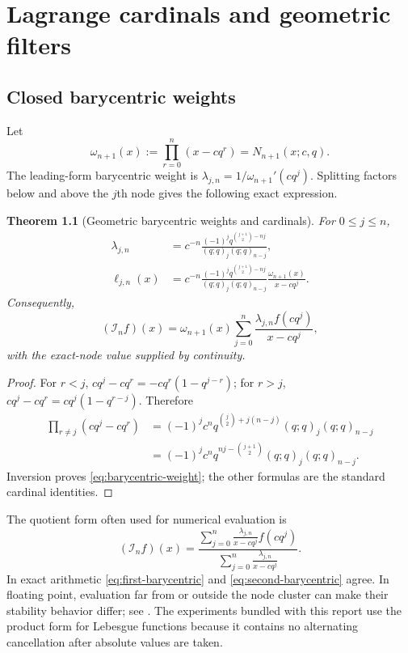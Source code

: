\documentclass[11pt,oneside]{book}
\numberwithin{equation}{chapter}
\newtheorem{theorem}{Theorem}[chapter]
\theoremstyle{definition}
\theoremstyle{remark}
\newcommand{\Interp}{\mathcal I}
\begin{document}
\chapter{Lagrange cardinals and geometric filters}
\label{chap:lagrange}

\section{Closed barycentric weights}

Let
\begin{equation}
 \omega_{n+1}(x):=\prod_{r=0}^n(x-cq^r)=N_{n+1}(x;c,q).
 \label{eq:nodal-polynomial}
\end{equation}
The leading-form barycentric weight is
$\lambda_{j,n}=1/\omega_{n+1}'(cq^j)$.  Splitting factors below and above the
$j$th node gives the following exact expression.

\begin{theorem}[Geometric barycentric weights and cardinals]
\label{thm:geometric-barycentric}
For $0\le j\le n$,
\begin{align}
 \lambda_{j,n}
 &=c^{-n}\frac{(-1)^j
 q^{\binom{j+1}{2}-nj}}
 {(q;q)_j(q;q)_{n-j}},
 \label{eq:barycentric-weight}\\
 \ell_{j,n}(x)
 &=c^{-n}\frac{(-1)^j
 q^{\binom{j+1}{2}-nj}}
 {(q;q)_j(q;q)_{n-j}}
 \frac{\omega_{n+1}(x)}{x-cq^j}.
 \label{eq:lagrange-cardinal-explicit}
\end{align}
Consequently,
\begin{equation}
 (\Interp_nf)(x)
 =\omega_{n+1}(x)
  \sum_{j=0}^n\frac{\lambda_{j,n}f(cq^j)}{x-cq^j},
 \label{eq:first-barycentric}
\end{equation}
with the exact-node value supplied by continuity.
\end{theorem}

\begin{proof}
For $r<j$,
$cq^j-cq^r=-cq^r(1-q^{j-r})$; for $r>j$,
$cq^j-cq^r=cq^j(1-q^{r-j})$.  Therefore
\begin{align*}
 \prod_{r\ne j}(cq^j-cq^r)
 &=(-1)^jc^n
 q^{\binom j2+j(n-j)}(q;q)_j(q;q)_{n-j}\\
 &=(-1)^jc^n
 q^{nj-\binom{j+1}{2}}(q;q)_j(q;q)_{n-j}.
\end{align*}
Inversion proves \eqref{eq:barycentric-weight}; the other formulas are the
standard cardinal identities.
\end{proof}

The quotient form often used for numerical evaluation is
\begin{equation}
 (\Interp_nf)(x)=
 \frac{\displaystyle\sum_{j=0}^n
       \frac{\lambda_{j,n}}{x-cq^j}f(cq^j)}
      {\displaystyle\sum_{j=0}^n
       \frac{\lambda_{j,n}}{x-cq^j}}.
 \label{eq:second-barycentric}
\end{equation}
In exact arithmetic \eqref{eq:first-barycentric} and
\eqref{eq:second-barycentric} agree.  In floating point, evaluation far from
or outside the node cluster can make their stability behavior differ; see
\cite{Higham2004,WebbTrefethenGonnet2012}.  The experiments bundled with this
report use the product form for Lebesgue functions because it contains no
alternating cancellation after absolute values are taken.
\end{document}

